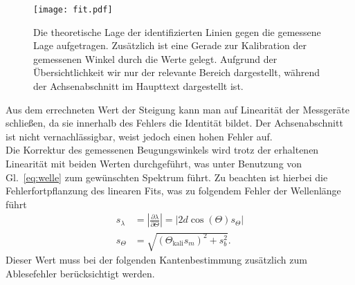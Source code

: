 \begin{figure}[h!]
    \centering
    \texttt{[image: fit.pdf]}
    \caption{\label{fig:fitkali}Die theoretische Lage der identifizierten Linien gegen 
    die gemessene Lage aufgetragen. Zusätzlich ist eine Gerade zur Kalibration der gemessenen 
    Winkel durch die Werte gelegt. Aufgrund der Übersichtlichkeit wir nur der relevante 
    Bereich dargestellt, während der Achsenabschnitt im Haupttext dargestellt ist.}
\end{figure}\FloatBarrier
Aus dem errechneten Wert der Steigung kann man auf Linearität der Messgeräte schließen, da sie innerhalb 
des Fehlers die Identität bildet. Der Achsenabschnitt ist nicht vernachlässigbar, weist jedoch einen
hohen Fehler auf. \\
Die Korrektur des gemessenen Beugungswinkels wird trotz der erhaltenen Linearität 
mit beiden Werten durchgeführt, was unter 
Benutzung von Gl.~\eqref{eq:welle} zum gewünschten Spektrum führt. 
Zu beachten ist hierbei die Fehlerfortpflanzung des linearen Fits, was zu folgendem 
Fehler der Wellenlänge führt
\begin{align}
    s_{\lambda} &= \left\vert\frac{\partial \lambda}{\partial \Theta}\right\vert = \left\vert2d\cos(\Theta)s_{\Theta}\right\vert  \label{eq:errkali}\\
    s_{\Theta} &= \sqrt{\left(\Theta_{\text{kali}}s_{m}\right)^{2} + s_{b}^{2}}.
\end{align}
Dieser Wert muss bei der folgenden Kantenbestimmung zusätzlich zum Ablesefehler berücksichtigt werden. \\
